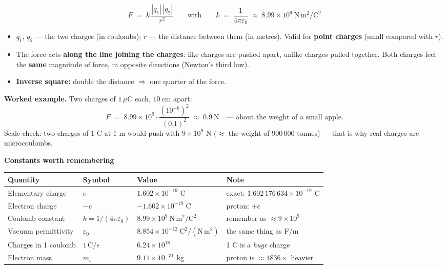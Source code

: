 \documentclass[11pt,a4paper]{article}
\newcommand{\nsec}[1]{\vspace{8pt}\par{\color{accent}\large\bfseries #1}\par\vspace{2pt}}
\begin{document}
\begin{tcolorbox}[colback=boxbg, colframe=accent, boxrule=0.9pt, arc=2.5mm,
                  left=10pt, right=10pt, top=7pt, bottom=7pt,
                  title={\large\bfseries Coulomb's law}, coltitle=white,
                  before skip=14pt]
\[
  F \;=\; k\,\frac{|q_1|\,|q_2|}{r^{2}}
  \qquad\text{with}\qquad
  k \;=\; \frac{1}{4\pi\varepsilon_0} \;\approx\; 8.99\times 10^{9}\ \mathrm{N\,m^{2}/C^{2}}
\]
\begin{itemize}[leftmargin=1.4em, itemsep=1.5pt, topsep=3pt]
  \item $q_1$, $q_2$ --- the two charges (in coulombs); $r$ --- the distance between them (in metres).
        Valid for \textbf{point charges} (small compared with $r$).
  \item The force acts \textbf{along the line joining the charges}: like charges are pushed apart,
        unlike charges pulled together. Both charges feel the \textbf{same} magnitude of force, in
        opposite directions (Newton's third law).
  \item \textbf{Inverse square:} double the distance $\Rightarrow$ one quarter of the force.
\end{itemize}
\smallskip
\textbf{Worked example.} Two charges of $1\,\mu$C each, $10\ \mathrm{cm}$ apart:
\[
  F \;=\; 8.99\times 10^{9} \cdot \frac{\left(10^{-6}\right)^{2}}{(0.1)^{2}}
  \;\approx\; 0.9\ \mathrm{N}
  \quad\text{--- about the weight of a small apple.}
\]
{\small\color{muted} Scale check: two charges of $1$ C at $1$ m would push with $9\times10^{9}$ N
($\approx$ the weight of 900\,000 tonnes) --- that is why real charges are microcoulombs.}
\end{tcolorbox}

\par\noindent\begin{minipage}{\linewidth}
\nsec{Constants worth remembering}
\renewcommand{\arraystretch}{1.25}
\begin{tabular}{@{}llll@{}}
\toprule
\textbf{Quantity} & \textbf{Symbol} & \textbf{Value} & \textbf{Note}\\
\midrule
Elementary charge    & $e$    & $1.602\times10^{-19}$ C  & {\small\color{muted} exact: $1.602\,176\,634\times10^{-19}$ C}\\
Electron charge      & $-e$   & $-1.602\times10^{-19}$ C & {\small\color{muted} proton: $+e$}\\
Coulomb constant     & $k = 1/(4\pi\varepsilon_0)$ & $8.99\times10^{9}\ \mathrm{N\,m^{2}/C^{2}}$ & {\small\color{muted} remember as $\approx 9\times10^{9}$}\\
Vacuum permittivity  & $\varepsilon_0$ & $8.854\times10^{-12}\ \mathrm{C^{2}/(N\,m^{2})}$ & {\small\color{muted} the same thing as F/m}\\
Charges in 1 coulomb & $1\,\mathrm{C}/e$ & $6.24\times10^{18}$ & {\small\color{muted} 1 C is a \emph{huge} charge}\\
Electron mass        & $m_e$  & $9.11\times10^{-31}$ kg  & {\small\color{muted} proton is ${\approx}1836\times$ heavier}\\
\bottomrule
\end{tabular}
\end{minipage}
\end{document}
